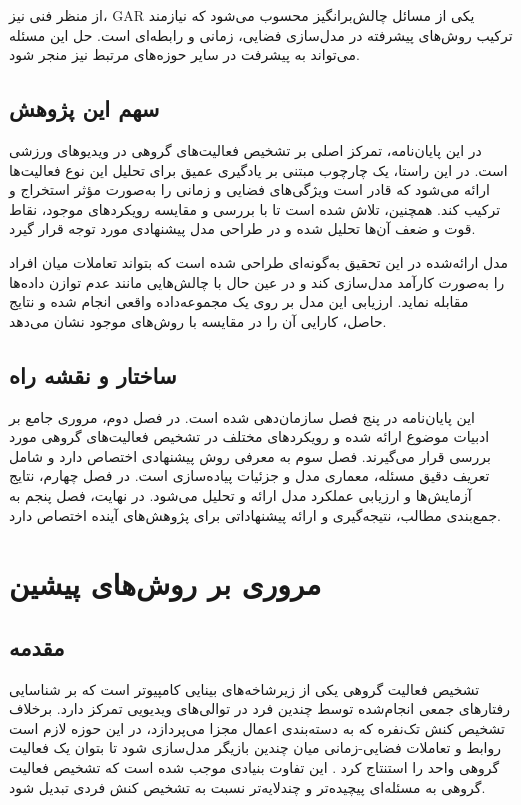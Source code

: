 \documentclass[12pt]{report}
\begin{document}
از منظر فنی نیز، GAR یکی از مسائل چالش‌برانگیز محسوب می‌شود که نیازمند ترکیب روش‌های پیشرفته در مدل‌سازی فضایی، زمانی و رابطه‌ای است. حل این مسئله می‌تواند به پیشرفت در سایر حوزه‌های مرتبط نیز منجر شود.

\section{سهم این پژوهش}
در این پایان‌نامه، تمرکز اصلی بر تشخیص فعالیت‌های گروهی در ویدیوهای ورزشی است. در این راستا، یک چارچوب مبتنی بر یادگیری عمیق برای تحلیل این نوع فعالیت‌ها ارائه می‌شود که قادر است ویژگی‌های فضایی و زمانی را به‌صورت مؤثر استخراج و ترکیب کند. همچنین، تلاش شده است تا با بررسی و مقایسه رویکردهای موجود، نقاط قوت و ضعف آن‌ها تحلیل شده و در طراحی مدل پیشنهادی مورد توجه قرار گیرد.

مدل ارائه‌شده در این تحقیق به‌گونه‌ای طراحی شده است که بتواند تعاملات میان افراد را به‌صورت کارآمد مدل‌سازی کند و در عین حال با چالش‌هایی مانند عدم توازن داده‌ها مقابله نماید. ارزیابی این مدل بر روی یک مجموعه‌داده واقعی انجام شده و نتایج حاصل، کارایی آن را در مقایسه با روش‌های موجود نشان می‌دهد.

\section{ساختار و نقشه راه}این پایان‌نامه در پنج فصل سازمان‌دهی شده است. در فصل دوم، مروری جامع بر ادبیات موضوع ارائه شده و رویکردهای مختلف در تشخیص فعالیت‌های گروهی مورد بررسی قرار می‌گیرند. فصل سوم به معرفی روش پیشنهادی اختصاص دارد و شامل تعریف دقیق مسئله، معماری مدل و جزئیات پیاده‌سازی است. در فصل چهارم، نتایج آزمایش‌ها و ارزیابی عملکرد مدل ارائه و تحلیل می‌شود. در نهایت، فصل پنجم به جمع‌بندی مطالب، نتیجه‌گیری و ارائه پیشنهاداتی برای پژوهش‌های آینده اختصاص دارد.

\chapter{مروری بر روش‌های پیشین}
\section{مقدمه}
تشخیص فعالیت گروهی یکی از زیرشاخه‌های بینایی کامپیوتر است که بر شناسایی رفتارهای جمعی انجام‌شده توسط چندین فرد در توالی‌های ویدیویی تمرکز دارد. برخلاف تشخیص کنش تک‌نفره که به دسته‌بندی اعمال مجزا می‌پردازد، در این حوزه لازم است روابط و تعاملات فضایی-زمانی میان چندین بازیگر مدل‌سازی شود تا بتوان یک فعالیت گروهی واحد را استنتاج کرد \cite{one,two}. این تفاوت بنیادی موجب شده است که تشخیص فعالیت گروهی به مسئله‌ای پیچیده‌تر و چندلایه‌تر نسبت به تشخیص کنش فردی تبدیل شود.
\end{document}
